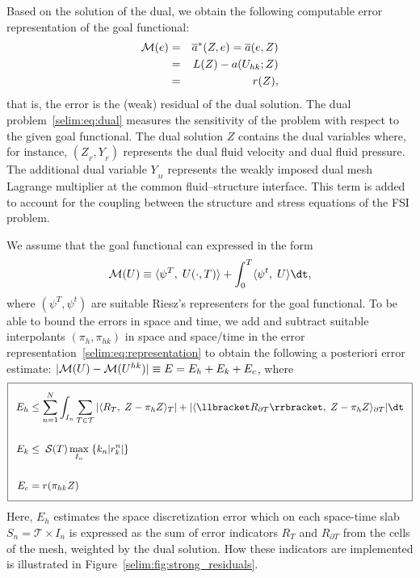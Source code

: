 Based on the solution of the dual, we obtain the following computable
error representation of the goal functional:
\begin{eqnarray}
\label{selim:eq:representation}
\nonumber
\mathcal{M}(e) &=& \overline{a}^{*}(Z ,e) = \overline{a}(e, Z)\\ &=& L(Z) - a(
U_{hk}; Z)\\
\nonumber
&=& r(Z),
\end{eqnarray}
that is, the error is the (weak) residual of the dual solution.  The
dual problem~\eqref{selim:eq:dual} measures the sensitivity of the
problem with respect to the given goal functional. The dual solution
$Z$ contains the dual variables where, for instance, $(Z_{_{F}},
Y_{_{F}})$ represents the dual fluid velocity and dual fluid pressure.
The additional dual variable $Y_{_{M}}$ represents the weakly imposed
dual mesh Lagrange multiplier at the common fluid--structure
interface.  This term is added to account for the coupling between the
structure and stress equations of the FSI problem.

We assume that the goal functional can expressed in the form
\begin{equation}
\M(U)  \equiv \langle \psi^T,\;  U(\cdot, T) \rangle +
\int_0^T \langle \psi^t,\; U \rangle \dt,
\end{equation}
where $(\psi^T, \psi^t)$ are suitable Riesz's representers for the
goal functional. To be able to bound the errors in space and time, we
add and subtract suitable interpolants $(\pi_h, \pi_{hk})$ in space
and space/time in the error
representation~\eqref{selim:eq:representation} to obtain the following
a posteriori error estimate: $|\mathcal{M}(U) - \mathcal{M}(U^{hk})| \equiv E = E_h +
E_k + E_c$, where
\begin{equation}
\label{selim:eq:aposteriori}
\addtolength{\fboxsep}{5pt} \boxed{
\begin{split}
E_h &\leq \sum_{n=1}^{N}\int_{I_n} \sum_{T\in\mathcal{T}}| \langle
R_T,\; Z - \pi_h Z \rangle_T |+ | \langle \llbracket R_{\partial T}
\rrbracket,\; Z - \pi_h Z \rangle _{\partial T}|\dt\\\\ E_k &\leq
\;\mathcal{S}(T)\max_{I_n}\;\{k_n | r_k ^n|\}\\\\ E_c &=
r(\pi_{hk}Z)
\end{split}
}
\end{equation}
Here, $E_h$ estimates the space discretization error which on each
space-time slab $S_n = \mathcal{T} \times I_n$ is expressed as the sum
of error indicators $R_T$ and $R_{\partial T}$ from the cells of the
mesh, weighted by the dual solution. How these indicators are
implemented is illustrated in Figure~\ref{selim:fig:strong_residuals}.

